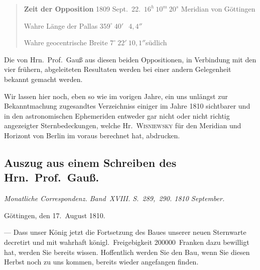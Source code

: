 \documentclass[12pt,a4paper]{book}
\begin{document}
\begin{quote}
\textbf{Zeit der Opposition} 1809 Sept.~22.\ $16^{h}\ 10^{m}\ 20^{s}$ Meridian von G\"ottingen

Wahre L\"ange der Pallas \dotfill $359^{\circ}\ 40'\ \phantom{0}4{,}4''$

Wahre geocentrische Breite \dotfill $7^{\circ}\ 22'\ 10{,}1''$\quad s\"udlich
\end{quote}

Die von Hrn.~Prof.~Gau{\ss} aus diesen beiden Oppositionen, in Verbindung mit den vier fr\"uhern, abgeleiteten Resultaten werden bei einer andern Gelegenheit bekannt gemacht werden.

Wir lassen hier noch, eben so wie im vorigen Jahre, ein uns unl\"angst zur Bekanntmachung zugesandtes Verzeichniss einiger im Jahre 1810 sichtbarer und in den astronomischen Ephemeriden entweder gar nicht oder nicht richtig angezeigter Sternbedeckungen, welche Hr.~\textsc{Wisniewsky} f\"ur den Meridian und Horizont von Berlin im voraus berechnet hat, abdrucken.


\newpage
\subsection*{Auszug aus einem Schreiben des Hrn.~Prof.~Gau{\ss}.}

\textit{Monatliche Correspondenz. Band~XVIII. S.~289,~290. 1810 September.}

G\"ottingen, den 17.~August 1810.

--- Dass unser K\"onig jetzt die Fortsetzung des Baues unserer neuen Sternwarte decretirt und mit wahrhaft k\"onigl.~Freigebigkeit 200000~Franken dazu bewilligt hat, werden Sie bereits wissen. Hoffentlich werden Sie den Bau, wenn Sie diesen Herbst noch zu uns kommen, bereits wieder angefangen finden.
\end{document}
